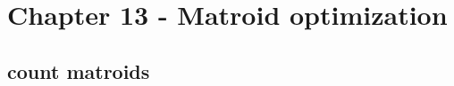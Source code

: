 \documentclass[12pt]{article}
\begin{document}
\section{Chapter 13 - Matroid optimization}
\subsection{count matroids}



\newpage


\end{document}
